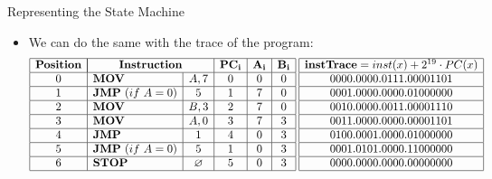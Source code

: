 \begin{frame}[allowframebreaks]{Representing the State Machine}
\begin{itemize}
\item We can do the same with the trace of the program:
\[
\begin{array}{|c|l|c|c|c|c|}
\hline
\mathbf{Position} & \multicolumn{2}{|c|}{\mathbf{Instruction}} & \mathbf{PC_i} & \mathbf{A_i} & \mathbf{B_i} \\ \hline
0 & \mathbf{MOV} & A, 7 & 0 & 0 & 0 \\ \hline
1 & \mathbf{JMP}~(if~A = 0) & 5 & 1 & 7 & 0 \\ \hline
2 & \mathbf{MOV} & B, 3 & 2 & 7 & 0 \\ \hline
3 & \mathbf{MOV} & A, 0 & 3 & 7 & 3 \\ \hline
4 & \mathbf{JMP} & 1 & 4 & 0 & 3 \\ \hline
5 & \mathbf{JMP}~(if~A = 0) & 5 & 1 & 0 & 3 \\ \hline
6 & \mathbf{STOP} & \emptyset & 5 & 0 & 3 \\ \hline
\end{array}
\hspace{0.1cm}
\begin{array}{|c|c|}
\hline
\mathbf{instTrace} = inst(x) + 2^{19} \cdot PC(x) \\ \hline
0000.0000.0111.00001101 \\ \hline
0001.0000.0000.01000000 \\ \hline
0010.0000.0011.00001110 \\ \hline
0011.0000.0000.00001101 \\ \hline
0100.0001.0000.01000000 \\ \hline
0001.0101.0000.11000000 \\ \hline
0000.0000.0000.00000000 \\ \hline
\end{array}
\]
\end{itemize}
\end{frame}












